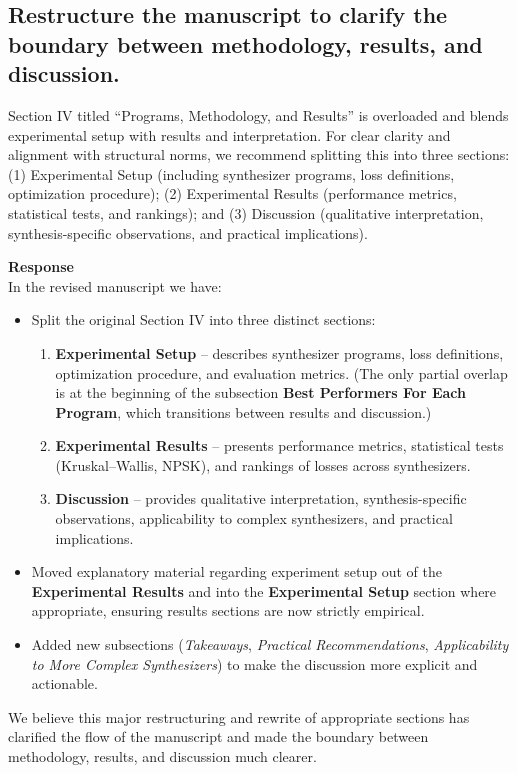 \documentclass[11pt]{article}
\begin{document}
\subsection*{Restructure the manuscript to clarify the boundary between methodology, results, and discussion.}
\noindent Section IV titled ``Programs, Methodology, and Results'' is overloaded and blends experimental setup with results and interpretation. For clear clarity and alignment with structural norms, we recommend splitting this into three sections: (1) Experimental Setup (including synthesizer programs, loss definitions, optimization procedure); (2) Experimental Results (performance metrics, statistical tests, and rankings); and (3) Discussion (qualitative interpretation, synthesis-specific observations, and practical implications).

\noindent\textbf{Response} \\
In the revised manuscript we have:
\begin{itemize}
  \item Split the original Section IV into three distinct sections:
    \begin{enumerate}
      \item \textbf{Experimental Setup} -- describes synthesizer programs, loss definitions, optimization procedure, and evaluation metrics.  (The only partial overlap is at the beginning of the subsection \textbf{Best Performers For Each Program}, which transitions between results and discussion.)
      \item \textbf{Experimental Results} -- presents performance metrics, statistical tests (Kruskal--Wallis, NPSK), and rankings of losses across synthesizers.
      \item \textbf{Discussion} -- provides qualitative interpretation, synthesis-specific observations, applicability to complex synthesizers, and practical implications.
    \end{enumerate}
  \item Moved explanatory material regarding experiment setup out of the \textbf{Experimental Results} and into the \textbf{Experimental Setup} section where appropriate, ensuring results sections are now strictly empirical.
  \item Added new subsections (\emph{Takeaways}, \emph{Practical Recommendations}, \emph{Applicability to More Complex Synthesizers}) to make the discussion more explicit and actionable.
\end{itemize}
We believe this major restructuring and rewrite of appropriate sections has clarified the flow of the manuscript and made the boundary between methodology, results, and discussion much clearer.
\end{document}
